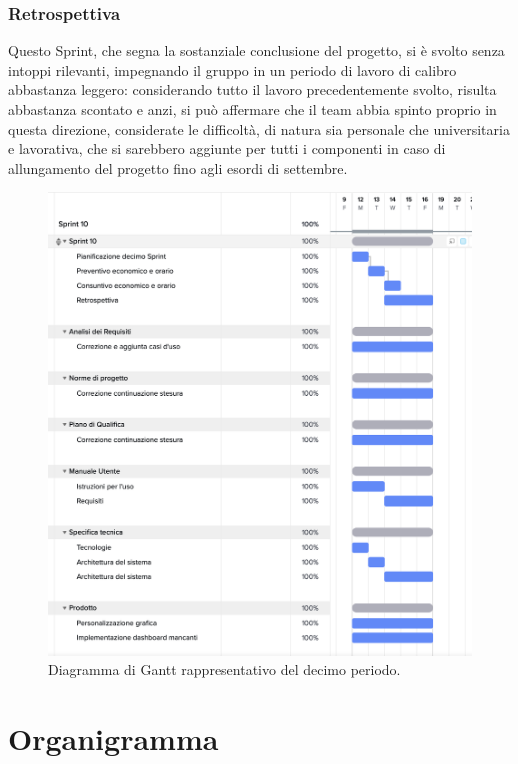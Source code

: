 \documentclass[8pt]{article}
\begin{document}
\subsubsection{Retrospettiva}
Questo Sprint, che segna la sostanziale conclusione del progetto, si è svolto senza intoppi rilevanti, impegnando il gruppo in un periodo di lavoro di calibro abbastanza leggero: considerando tutto il lavoro precedentemente svolto, risulta abbastanza scontato e anzi, si può affermare che il team abbia spinto proprio in questa direzione, considerate le difficoltà, di natura sia personale che universitaria e lavorativa, che si sarebbero aggiunte  per tutti i componenti in caso di allungamento del progetto fino agli esordi di settembre.   
\begin{figure}[h!]
    \centering
    \includegraphics[width=13cm]{./images_pdp/gantt10.png}
    \caption{Diagramma di Gantt rappresentativo del decimo periodo.}
\end{figure}
\clearpage
\newpage
\section{Organigramma} \label{sec:organigramma}
\end{document}
